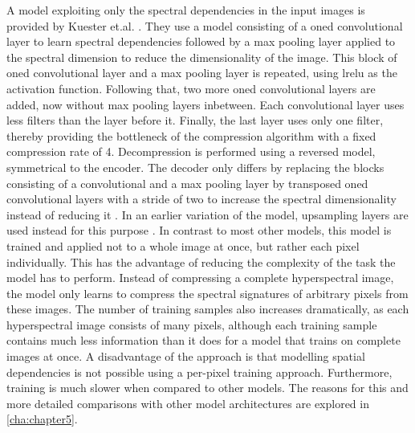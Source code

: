 A model exploiting only the spectral dependencies in the input images is provided by Kuester et.al. \citep{kuester_1d-convolutional_2021}\citep{kuester_transferability_2022}. They use a model consisting of a \ac{oned} convolutional layer to learn spectral dependencies followed by a max pooling layer applied to the spectral dimension to reduce the dimensionality of the image. This block of \ac{oned} convolutional layer and a max pooling layer is repeated, using \ac{lrelu} as the activation function. Following that, two more \ac{oned} convolutional layers are added, now without max pooling layers inbetween. Each convolutional layer uses less filters than the layer before it. Finally, the last layer uses only one filter, thereby providing the bottleneck of the compression algorithm with a fixed compression rate of 4. Decompression is performed using a reversed model, symmetrical to the encoder. The decoder only differs by replacing the blocks consisting of a convolutional and a max pooling layer by transposed \ac{oned} convolutional layers with a stride of two to increase the spectral dimensionality instead of reducing it \citep{kuester_transferability_2022}. In an earlier variation of the model, upsampling layers are used instead for this purpose \citep{kuester_1d-convolutional_2021}. In contrast to most other models, this model is trained and applied not to a whole image at once, but rather each pixel individually. This has the advantage of reducing the complexity of the task the model has to perform. Instead of compressing a complete hyperspectral image, the model only learns to compress the spectral signatures of arbitrary pixels from these images. The number of training samples also increases dramatically, as each hyperspectral image consists of many pixels, although each training sample contains much less information than it does for a model that trains on complete images at once. A disadvantage of the approach is that modelling spatial dependencies is not possible using a per-pixel training approach. Furthermore, training is much slower when compared to other models. The reasons for this and more detailed comparisons with other model architectures are explored in \autoref{cha:chapter5}.

